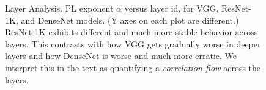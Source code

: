 \begin{figure}[t]
    \centering

    \caption{Layer Analysis. 
             PL exponent $\alpha$ versus layer id, for VGG, ResNet-1K, and DenseNet models.  
             (Y axes on each plot are different.)  
             ResNet-1K exhibits different and much more stable behavior across layers.
             This contrasts with how VGG gets gradually worse in deeper layers and how DenseNet is worse and much more erratic.  
             We interpret this in the text as quantifying a \emph{correlation flow} across the layers.  
            }
    \label{fig:3models-alpha-layers}
\end{figure}

